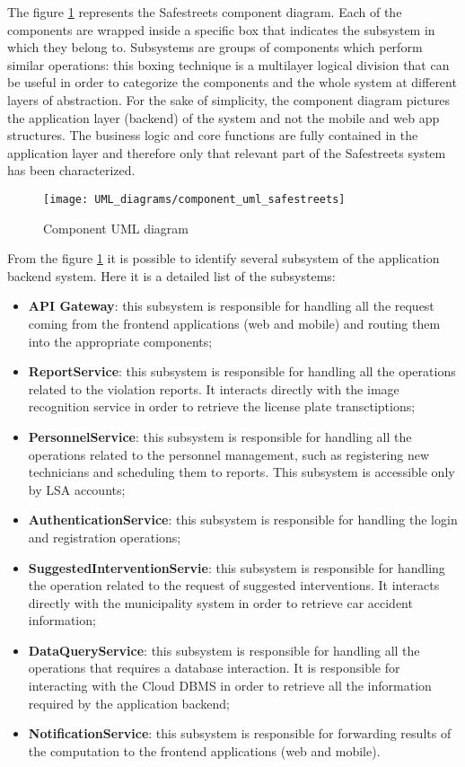 The figure \ref{fig:component_diagram} represents the Safestreets component diagram. Each of the components are wrapped inside a specific box that indicates the subsystem in which they belong to.
\newline Subsystems are groups of components which perform similar operations: this boxing technique is a multilayer logical division that can be useful in order to categorize the components and the whole system at different layers of abstraction.
\newline For the sake of simplicity, the component diagram pictures the application layer (backend) of the system and not the mobile and web app structures. The business logic and core functions are fully contained in the application layer and therefore only that relevant part of the Safestreets system has been characterized.
\begin{figure}[H]
    \centering
    \texttt{[image: UML\_diagrams/component\_uml\_safestreets]}
    \caption{Component UML diagram}
    \label{fig:component_diagram}
\end{figure}
From the figure \ref{fig:component_diagram} it is possible to identify several subsystem of the application backend system. Here it is a detailed list of the subsystems:
\begin{itemize}
    \item \textbf{API Gateway}: this subsystem is responsible for handling all the request coming from the frontend applications (web and mobile) and routing them into the appropriate components;
    \item \textbf{ReportService}: this subsystem is responsible for handling all the operations related to the violation reports. It interacts directly with the image recognition service in order to retrieve the license plate transctiptions;
    \item \textbf{PersonnelService}: this subsystem is responsible for handling all the operations related to the personnel management, such as registering new technicians and scheduling them to reports. This subsystem is accessible only by LSA accounts;
    \item \textbf{AuthenticationService}: this subsystem is responsible for handling the login and registration operations;
    \item \textbf{SuggestedInterventionServie}: this subsystem is responsible for handling the operation related to the request of suggested interventions. It interacts directly with the municipality system in order to retrieve car accident information;
    \item \textbf{DataQueryService}: this subsystem is responsible for handling all the operations that requires a database interaction. It is responsible for interacting with the Cloud DBMS in order to retrieve all the information required by the application backend;
    \item \textbf{NotificationService}: this subsystem is responsible for forwarding results of the computation to the frontend applications (web and mobile).
\end{itemize} 
